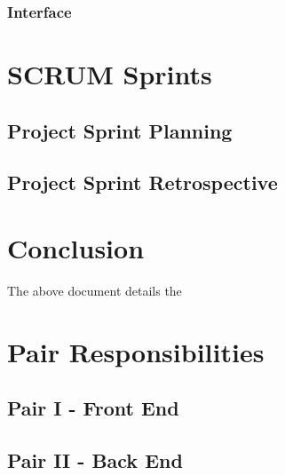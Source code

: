 \documentclass{article}
\begin{document}
\subsubsection{Interface}

\section{SCRUM Sprints}

\subsection{Project Sprint Planning}

\subsection{Project Sprint Retrospective}

\section{Conclusion}
The above document details the 



\appendix

\section{Pair Responsibilities}

\subsection{Pair I - Front End}

\subsection{Pair II - Back End}
\end{document}

